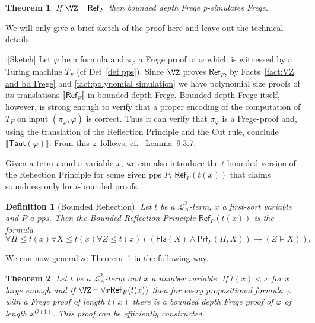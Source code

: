 \documentclass{LMCS}
\newtheorem{theorem}{Theorem}[section]
\newtheorem{definition}{Definition}[section]
\newenvironment{proof}{\QuadSpace\par\noindent{\bf
Proof}:}{\EndProof\HalfSpace} \fi
\newcommand{\QuadSpace}{}\newcommand{\HalfSpace}{}\newcommand{\FullSpace}{}\newcommand{\EndProof}{ \hfill \vrule width 1ex height 1ex depth 0pt }
\newenvironment{proof}{

\smallskip
\noindent\emph{Proof.}}{\hfill\(\Box\)
\bigskip
} \fi
\begin{document}
\begin{theorem}\label{Thm Simulation by Reflection}
  If $\VZ\vdash \mathsf{Ref}_{F}$ then bounded depth Frege
  p-simulates Frege.
\end{theorem}
We will only give a brief sketch of the proof here and leave out the technical details.
\begin{proof}[Sketch]
Let $\varphi$ be a formula and $\pi_{\varphi}$ a Frege proof of $\varphi$ which is witnessed by a Turing machine
$T_F$ (cf Def~\ref{def pps}). Since $\VZ$ proves $\mathsf{Ref}_{F}$, by Facts~\ref{fact:VZ and bd Frege} and
\ref{fact:polynomial simulation} we have polynomial size proofs of its translations $\llbracket
\mathsf{Ref}_F\rrbracket$ in bounded depth Frege. Bounded depth Frege itself, however, is strong enough to
verify that a proper encoding of the computation of $T_F$ on input $(\pi_\varphi,\varphi)$ is correct. Thus it
can verify that $\pi_{\varphi}$ is a Frege-proof and, using the translation of the Reflection Principle and the
Cut rule, conclude $\llbracket\mathsf{Taut}(\varphi)\rrbracket$. From this $\varphi$ follows, cf.~\cite{Kra95}
Lemma~9.3.7.
\end{proof}

Given a term $t$ and a variable $x$, we can also introduce the  $t$-bounded version of the Reflection Principle
for some given pps $P$, $\mathsf{Ref}_P(t(x))$ that claims soundness only for $t$-bounded proofs.

\begin{definition}
  [Bounded Reflection] Let $t$ be a $\mathcal L^2_{A}$-term, $x$
  a first-sort variable and $P$ a pps. Then the {\em Bounded
  Reflection Principle} $\mathsf{Ref}_P(t(x))$ is the formula
  $$\forall \Pi\leq t(x)\forall X\leq t(x)\forall Z\leq t(x)((\mathsf{Fla}(X)\land
  \mathsf{Prf}_P(\Pi,X))\rightarrow (Z\vDash X)).$$
\end{definition}



We can now generalize Theorem~\ref{Thm Simulation by Reflection} in the following way.

\begin{theorem}
  \label{Thm Simulation by Bounded Reflection}
  Let $t$ be a $\mathcal L^2_{A}$-term and $x$
  a number variable. If $t(x)<x$ for $x$ large enough
  and if $\VZ\vdash \forall x \mathsf{Ref}_{F}(t(x))$ then for every
  propositional formula $\varphi$ with a Frege proof of length
  $t(x)$ there is a bounded depth Frege proof of $\varphi$ of length
  $x^{O(1)}$. This proof can be efficiently constructed.
\end{theorem}
\end{document}
